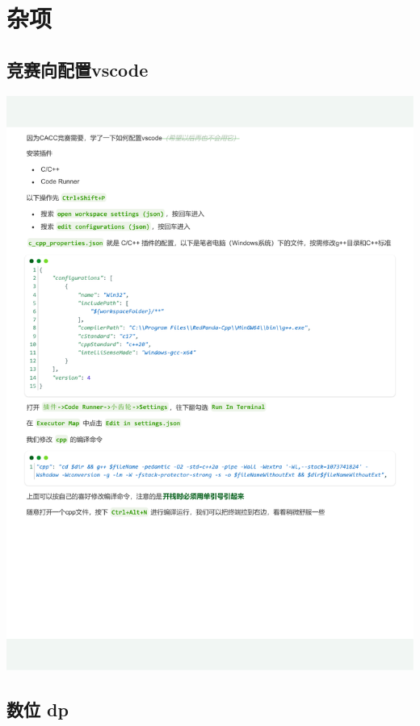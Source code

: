 \documentclass[12pt]{article}
\begin{document}


{\centering\section{杂项}}
\subsection{竞赛向配置vscode}

\begin{center}
\includegraphics[width=1.1\textwidth]{"../Template/Other/vscode.pdf"}
\end{center}
% 

\newpage

\subsection{数位 dp}
\end{document}
